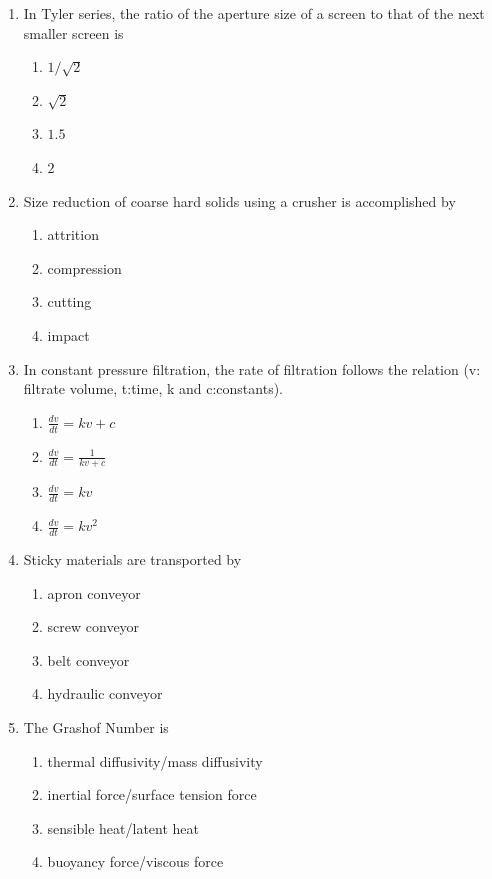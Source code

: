 \documentclass[journal,12pt,onecolumn]{IEEEtran}
\theoremstyle{remark}
\begin{document}
\begin{enumerate}
    \item In Tyler series, the ratio of the aperture size of a screen to that of the next smaller screen is 

\begin{enumerate}
    \item $1/\sqrt{2}$
    \item $\sqrt{2}$
    \item $1.5$
    \item $2$
\end{enumerate}

    \item Size reduction of coarse hard solids using a crusher is accomplished by

\begin{enumerate}
        \item attrition
        \item compression
        \item cutting
        \item impact
\end{enumerate}

    \item In constant pressure filtration, the rate of filtration follows the relation (v: filtrate volume, t:time, k and c:constants).

\begin{enumerate}
    \item $\frac{dv}{dt}=kv+c$
    \item $\frac{dv}{dt}=\frac{1}{kv+c}$
    \item $\frac{dv}{dt}=kv$
    \item $\frac{dv}{dt}=kv^2$
\end{enumerate}

    \item Sticky materials are transported by

\begin{enumerate}
    \item apron conveyor
    \item screw conveyor
    \item belt conveyor
    \item hydraulic conveyor
\end{enumerate}

    \item The Grashof Number is

\begin{enumerate}
    \item thermal diffusivity/mass diffusivity
    \item inertial force/surface tension force
    \item sensible heat/latent heat
    \item buoyancy force/viscous force
\end{enumerate}


\end{enumerate}
\end{document}
